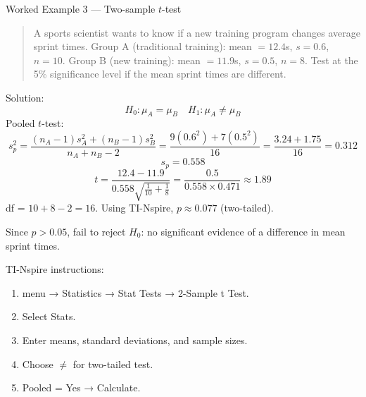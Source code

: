 \documentclass[11pt]{article}
\def\textbf#1{#1}%
\def\texttt#1{#1}%
\begin{document}
\textbf{Worked Example 3 — Two-sample $t$-test }
\begin{quote}
A sports scientist wants to know if a new training program changes average sprint times.  
Group A (traditional training): mean $= 12.4$s, $s=0.6$, $n=10$.  
Group B (new training): mean $= 11.9$s, $s=0.5$, $n=8$.  
Test at the 5\% significance level if the mean sprint times are different.
\end{quote}

\textbf{Solution:}
\[
H_0: \mu_A = \mu_B \quad H_1: \mu_A \neq \mu_B
\]
Pooled $t$-test:
\[
s_p^2 = \frac{(n_A-1)s_A^2 + (n_B-1)s_B^2}{n_A + n_B - 2}
= \frac{9(0.6^2) + 7(0.5^2)}{16}
= \frac{3.24 + 1.75}{16} = 0.312
\]
\[
s_p = 0.558
\]
\[
t = \frac{12.4 - 11.9}{0.558 \sqrt{\frac{1}{10} + \frac{1}{8}}}
= \frac{0.5}{0.558 \times 0.471} \approx 1.89
\]
df = $10 + 8 - 2 = 16$.  
Using TI-Nspire, $p \approx 0.077$ (two-tailed).

Since $p > 0.05$, fail to reject $H_0$: no significant evidence of a difference in mean sprint times.

\textbf{TI-Nspire instructions:}
\begin{enumerate}
    \item \texttt{menu} → \texttt{Statistics} → \texttt{Stat Tests} → \texttt{2-Sample t Test}.
    \item Select \texttt{Stats}.
    \item Enter means, standard deviations, and sample sizes.
    \item Choose $\neq$ for two-tailed test.
    \item Pooled = \texttt{Yes} → \texttt{Calculate}.
\end{enumerate}





\end{document}
